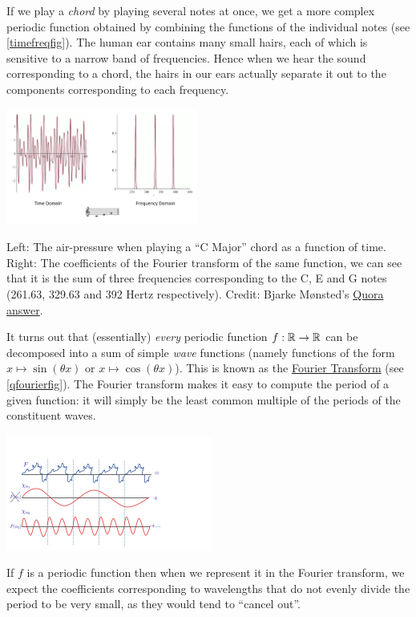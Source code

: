 If we play a \emph{chord} by playing several notes at once, we get a
more complex periodic function obtained by combining the functions of
the individual notes (see \cref{timefreqfig}). The human ear contains
many small hairs, each of which is sensitive to a narrow band of
frequencies. Hence when we hear the sound corresponding to a chord, the
hairs in our ears actually separate it out to the components
corresponding to each frequency.


\begin{marginfigure}
\centering
\includegraphics[width=\linewidth, height=1.5in, keepaspectratio]{../figure/timefreq.png}
\caption{Left: The air-pressure when playing a ``C Major'' chord as a
function of time. Right: The coefficients of the Fourier transform of
the same function, we can see that it is the sum of three frequencies
corresponding to the C, E and G notes (261.63, 329.63 and 392 Hertz
respectively). Credit: Bjarke Mønsted's
\href{https://www.quora.com/What-is-the-meaning-of-frequency-domain}{Quora
answer}.}
\label{timefreqfig}
\end{marginfigure}

It turns out that (essentially) \emph{every} periodic function
\(f:{\mathbb{R}} \rightarrow {\mathbb{R}}\) can be decomposed into a sum of simple
\emph{wave} functions (namely functions of the form
\(x \mapsto \sin(\theta x)\) or \(x \mapsto \cos(\theta x)\)). This is
known as the
\href{https://en.wikipedia.org/wiki/Fourier_transform}{Fourier
Transform} (see \cref{qfourierfig}). The Fourier transform makes it easy
to compute the period of a given function: it will simply be the least
common multiple of the periods of the constituent waves.


\begin{marginfigure}
\centering
\includegraphics[width=\linewidth, height=1.5in, keepaspectratio]{../figure/quantum_fourier.jpg}
\caption{If \(f\) is a periodic function then when we represent it in
the Fourier transform, we expect the coefficients corresponding to
wavelengths that do not evenly divide the period to be very small, as
they would tend to ``cancel out''.}
\label{qfourierfig}
\end{marginfigure}

